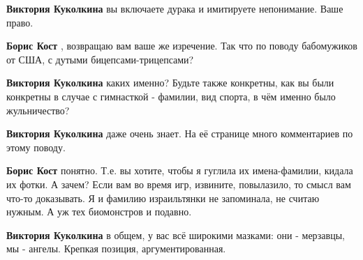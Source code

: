 \begin{itemize}
\begin{itemize}
\textbf{Виктория Куколкина} вы включаете дурака и имитируете непонимание. Ваше право.

 
\textbf{Борис Кост} , возвращаю вам ваше же изречение. Так что по поводу бабомужиков от США, с дутыми бицепсами-трицепсами?

 
\textbf{Виктория Куколкина} каких именно? Будьте также конкретны, как вы были
конкретны в случае с гимнасткой - фамилии, вид спорта, в чём именно было
жульничество?

 
\textbf{Виктория Куколкина} даже очень знает. На её странице много комментариев по этому поводу.

 
\textbf{Борис Кост} понятно. Т.е. вы хотите, чтобы я гуглила их имена-фамилии,
кидала их фотки. А зачем? Если вам во время игр, извините, повылазило, то смысл
вам что-то доказывать. Я и фамилию израильтянки не запоминала, не считаю
нужным. А уж тех биомонстров и подавно.

 
\textbf{Виктория Куколкина} в общем, у вас всё широкими мазками: они - мерзавцы, мы - ангелы. Крепкая позиция, аргументированная.


\end{itemize}
\end{itemize}
